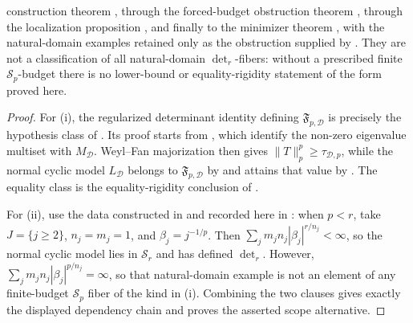 \begin{proposition}
  construction theorem
  , through the forced-budget
  obstruction theorem
  , through the
  localization proposition , and
  finally to the minimizer theorem
  , with the natural-domain
  examples retained only as the obstruction supplied by
  .  They are not a
  classification of all natural-domain \(\det_r\)-fibers: without a prescribed
  finite \(\mathcal S_p\)-budget there is no lower-bound or equality-rigidity
  statement of the form proved here.
\end{proposition}

\begin{proof}
  For \textup{(i)}, the regularized determinant identity defining
  \(\mathfrak F_{p,\mathcal D}\) is precisely the hypothesis class of
  .  Its proof starts from
  ,
  which identify the non-zero eigenvalue multiset with
  \(M_{\mathcal D}\).  Weyl--Fan majorization then gives
  \(\|T\|_p^p\ge\tau_{\mathcal D,p}\), while the normal cyclic model
  \(L_{\mathcal D}\) belongs to \(\mathfrak F_{p,\mathcal D}\) by
   and attains that value
  by .  The equality class is the
  equality-rigidity conclusion of
  .

  For \textup{(ii)}, use the data constructed in
   and recorded here in
  : when \(p<r\), take
  \(J=\{j\ge2\}\), \(n_j=m_j=1\), and \(\beta_j=j^{-1/p}\).  Then
  \(\sum_j m_jn_j|\beta_j|^{r/n_j}<\infty\), so the normal cyclic model lies
  in \(\mathcal S_r\) and has defined \(\det_r\).  However,
  \(\sum_j m_jn_j|\beta_j|^{p/n_j}=\infty\), so that natural-domain
  example is not an element of any finite-budget \(\mathcal S_p\) fiber of the
  kind in \textup{(i)}.  Combining the two clauses gives exactly the displayed
  dependency chain and proves the asserted scope alternative.
\end{proof}

